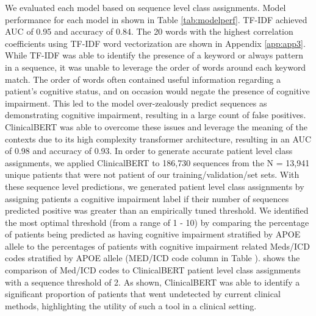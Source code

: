 \documentclass[pmlr,twocolumn,10pt]{jmlr} %
\begin{document}


We evaluated each model based on sequence level class assignments. Model performance for each model in shown in Table \ref{tab:modelperf}. TF-IDF achieved AUC of 0.95 and accuracy of 0.84. The 20 words with the highest correlation coefficients using TF-IDF word vectorization are shown in Appendix \ref{app:app3}. While TF-IDF was able to identify the presence of a keyword or always pattern in a sequence, it was unable to leverage the order of words around each keyword match. The order of words often contained useful information regarding a patient's cognitive status, and on occasion would negate the presence of cognitive impairment. This led to the model over-zealously predict sequences as demonstrating cognitive impairment, resulting in a large count of false positives. ClinicalBERT was able to overcome these issues and leverage the meaning of the contexts due to its high complexity transformer architecture, resulting in an AUC of 0.98 and accuracy of 0.93. In order to generate accurate patient level class assignments, we applied ClinicalBERT to 186,730 sequences from the N = 13,941 unique patients that were not patient of our training/validation/set sets. With these sequence level predictions, we generated patient level class assignments by assigning patients a cognitive impairment label if their number of sequences predicted positive was greater than an empirically tuned threshold. We identified the most optimal threshold (from a range of 1 - 10) by comparing the percentage of patients being predicted as having cognitive impairment stratified by APOE allele to the percentages of patients with cognitive impairment related Meds/ICD codes stratified by APOE allele (MED/ICD code column in Table ).  shows the comparison of Med/ICD codes to ClinicalBERT patient level class assignments with a sequence threshold of 2. As shown, ClinicalBERT was able to identify a significant proportion of patients that went undetected by current clinical methods, highlighting the utility of such a tool in a clinical setting. 
\end{document}
